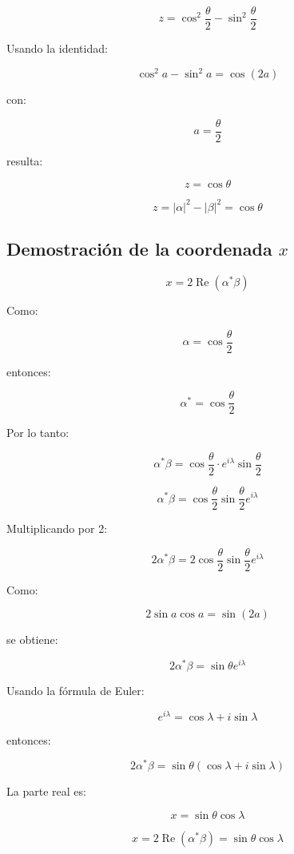 \documentclass[12pt,a4paper]{article}
\begin{document}
\[
z=
\cos^2\frac{\theta}{2}
-
\sin^2\frac{\theta}{2}
\]

Usando la identidad:

\[
\cos^2 a-\sin^2 a=\cos(2a)
\]

con:

\[
a=\frac{\theta}{2}
\]

resulta:

\[
z=\cos\theta
\]

\begin{resultado}
\[
\boxed{z=|\alpha|^2-|\beta|^2=\cos\theta}
\]
\end{resultado}

\subsection{Demostración de la coordenada \texorpdfstring{$x$}{x}}

\[
x=2\operatorname{Re}(\alpha^*\beta)
\]

Como:

\[
\alpha=\cos\frac{\theta}{2}
\]

entonces:

\[
\alpha^*=\cos\frac{\theta}{2}
\]

Por lo tanto:

\[
\alpha^*\beta=
\cos\frac{\theta}{2}
\cdot
e^{i\lambda}\sin\frac{\theta}{2}
\]

\[
\alpha^*\beta=
\cos\frac{\theta}{2}
\sin\frac{\theta}{2}
e^{i\lambda}
\]

Multiplicando por 2:

\[
2\alpha^*\beta=
2\cos\frac{\theta}{2}
\sin\frac{\theta}{2}
e^{i\lambda}
\]

Como:

\[
2\sin a\cos a=\sin(2a)
\]

se obtiene:

\[
2\alpha^*\beta=\sin\theta e^{i\lambda}
\]

Usando la fórmula de Euler:

\[
e^{i\lambda}=\cos\lambda+i\sin\lambda
\]

entonces:

\[
2\alpha^*\beta
=
\sin\theta(\cos\lambda+i\sin\lambda)
\]

La parte real es:

\[
x=\sin\theta\cos\lambda
\]

\begin{resultado}
\[
\boxed{x=2\operatorname{Re}(\alpha^*\beta)=\sin\theta\cos\lambda}
\]
\end{resultado}
\end{document}
